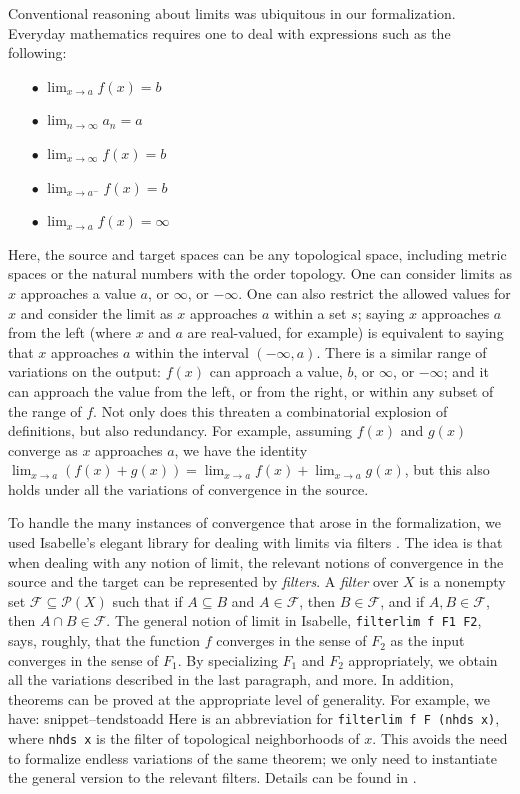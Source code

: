 \documentclass{svjour3}
\newcommand{\Snippet}[1]{\csname snippet--#1\endcsname}
\begin{document}
Conventional reasoning about limits was ubiquitous in our formalization. Everyday mathematics requires one to deal with expressions such as the following:
\begin{itemize}
 \item[$\bullet$] $\lim_{x \to a} f(x) = b$
 \item[$\bullet$] $\lim_{n \to \infty} a_n = a$
 \item[$\bullet$] $\lim_{x \to \infty} f(x) = b$
 \item[$\bullet$] $\lim_{x \to a^-} f(x) = b$
 \item[$\bullet$] $\lim_{x \to a} f(x) = \infty$
\end{itemize}
Here, the source and target spaces can be any topological space, including metric spaces or the natural numbers with the order topology. One can consider limits as $x$ approaches a value $a$, or $\infty$, or $-\infty$. One can also restrict the allowed values for $x$ and consider the limit as $x$ approaches $a$ within a set $s$; saying $x$ approaches $a$ from the left (where $x$ and $a$ are real-valued, for example) is equivalent to saying that $x$ approaches $a$ within the interval $(-\infty, a)$. There is a similar range of variations on the output: $f(x)$ can approach a value, $b$, or $\infty$, or $-\infty$; and it can approach the value from the left, or from the right, or within any subset of the range of $f$. Not only does this threaten a combinatorial explosion of definitions, but also redundancy. For example, assuming $f(x)$ and $g(x)$ converge as $x$ approaches $a$, we have the identity $\lim_{x \to a} (f(x) + g(x)) = \lim_{x \to a} f(x) + \lim_{x \to a} g(x)$, but this also holds under all the variations of convergence in the source.

To handle the many instances of convergence that arose in the formalization, we used Isabelle's elegant library for dealing with limits via filters \cite{hoelzl:et:al:13}. The idea is that when dealing with any notion of limit, the relevant notions of convergence in the source and the target can be represented by \emph{filters}. A {\em filter} over $X$ is a nonempty set $\mathcal F \subseteq \mathcal P(X)$ such that if $A \subseteq B$ and $A \in \mathcal F$, then $B \in \mathcal F$, and if $A, B \in \mathcal F$, then $A \cap B \in \mathcal F$. The general notion of limit in Isabelle, {\tt filterlim f F1 F2}, says, roughly, that the function $f$ converges in the sense of $F_2$ as the input converges in the sense of $F_1$. By specializing $F_1$ and $F_2$ appropriately, we obtain all the variations described in the last paragraph, and more. In addition, theorems can be proved at the appropriate level of generality. For example, we have:
\Snippet{tendstoadd}
Here  is an abbreviation for {\tt filterlim f F (nhds x)}, where {\tt nhds x} is the filter of topological neighborhoods of $x$. This avoids the need to formalize endless variations of the same theorem; we only need to instantiate the general version to the relevant filters. Details can be found in \cite{hoelzl:et:al:13}.
\end{document}
